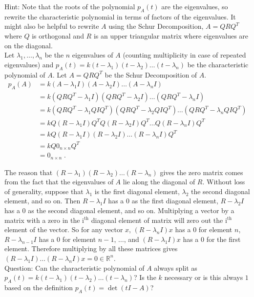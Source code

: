 \documentclass[a4paper]{article}
\begin{document}
\begin{enumerate}
Hint: Note that the roots of the polynomial $p_A(t)$ are the eigenvalues, so rewrite the characteristic
polynomial in terms of factors of the eigenvalues. It might also be helpful to rewrite $A$ using the Schur
Decomposition, $A = QRQ^T$ where $Q$ is orthogonal and $R$ is an upper triangular matrix where eigenvalues are on the diagonal.\\

Let $\lambda_1, \dots , \lambda_n$ be the $n$ eigenvalues of $A$ (counting multiplicity in case of repeated eigenvalues) and $p_A(t) = k(t-\lambda_1)(t-\lambda_2)\dots (t-\lambda_n)$ be the characteristic polynomial of $A$. Let $A = QRQ^T$ be the Schur Decomposition of $A$. 
\begin{align*}
p_A(A) &= k(A - \lambda_1 I)(A - \lambda_2 I) \dots (A - \lambda_n I) \\
&= k(QRQ^T - \lambda_1 I) (QRQ^T - \lambda_2 I) \dots (QRQ^T - \lambda_n I) \\
&= k(QRQ^T - \lambda_1 QIQ^T) (QRQ^T - \lambda_2 QIQ^T) \dots (QRQ^T - \lambda_n QIQ^T) \\
&= kQ(R - \lambda_1 I)Q^TQ(R - \lambda_2 I)Q^T \dots Q(R - \lambda_n I)Q^T \\
&= kQ(R - \lambda_1 I)(R - \lambda_2 I) \dots (R - \lambda_n I)Q^T \\
&= kQ0_{n\times n} Q^T \\
&= 0_{n\times n} \;.
\end{align*}

The reason that $(R-\lambda_1)(R-\lambda_2) \dots (R -\lambda_n)$ gives the zero matrix comes from the fact that the eigenvalues of $A$ lie along the diagonal of $R$. Without loss of generality, suppose that $\lambda_1$ is the first diagonal element, $\lambda_2$ the second diagonal element, and so on. Then $R -\lambda_1I$ has a 0 as the first diagonal element, $R-\lambda_2I$ has a 0 as the second diagonal element, and so on. Multiplying a vector by a matrix with a zero in the i$^{\text{th}}$ diagonal element of matrix will zero out the i$^{\text{th}}$ element of the vector. So for any vector $x$, $(R-\lambda_nI)x$ has a 0 for element $n$, $R-\lambda_{n-1}I$ has a 0 for element $n-1$, $\dots$, and $(R - \lambda_1I)x$ has a 0 for the first element. Therefore multiplying by all these matrices gives $(R-\lambda_1I) \dots (R-\lambda_nI)x = 0 \in \mathbb{R}^{n}$. \\

Question: Can the characteristic polynomial of $A$ always split as $p_A(t) = k(t-\lambda_1)(t-\lambda_2)\dots (t-\lambda_n)$? Is the $k$ necessary or is this always $1$ based on the definition $p_A(t) = \det(tI - A)$?


\end{enumerate}
\end{document}

